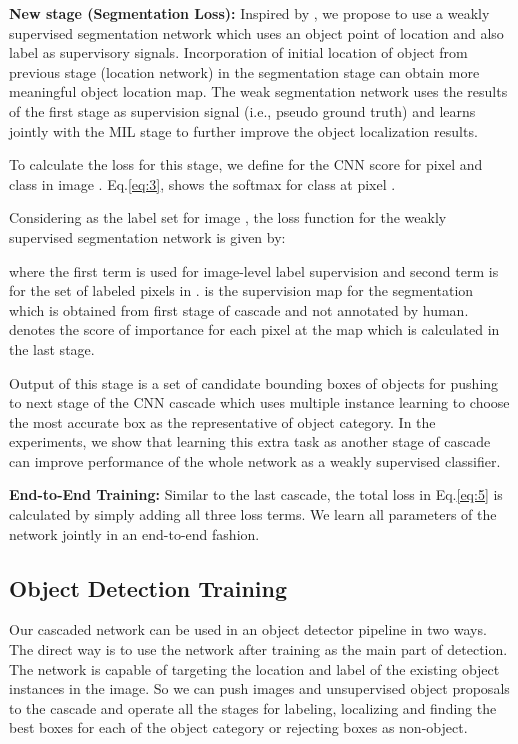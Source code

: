 \documentclass[10pt,twocolumn,letterpaper]{article}
\begin{document}
\textbf{New stage (Segmentation Loss):} Inspired by \cite{pointwise, weakSeg}, we propose to use a weakly supervised segmentation network which uses an object point of location and also label as supervisory signals. Incorporation of initial location of object from previous stage (location network) in the segmentation stage can obtain more meaningful object location map. The weak segmentation network uses the results of the first stage as supervision signal (i.e., pseudo ground truth) and learns jointly with the MIL stage to further improve the object localization results.

To calculate the loss for this stage, we define  for the CNN score for pixel  and class  in image . Eq.\ref{eq:3}, shows the softmax for class  at pixel .



Considering  as the label set for image , the loss function for the weakly supervised segmentation network is given by:

\noindent where the first term is used for image-level label supervision and second term is for the set of labeled pixels in .  is the supervision map for the segmentation which is obtained from first stage of cascade and not annotated by human.  denotes the score of importance for each pixel at the map which is calculated in the last stage.

Output of this stage is a set of candidate bounding boxes of objects for pushing to next stage of the CNN cascade which uses multiple instance learning to choose the most accurate box as the representative of object category.  In the experiments, we show that learning this extra task as another stage of cascade can improve performance of the whole network as a weakly supervised classifier.

\textbf{End-to-End Training:}
Similar to the last cascade, the total loss in Eq.\ref{eq:5} is calculated by simply adding all three loss terms. We learn all parameters of the network jointly in an end-to-end fashion.




\subsection{Object Detection Training}
Our cascaded network can be used in an object detector pipeline in two ways. The direct way is to use the network after training as the main part of detection. The network is capable of targeting the location and label of the existing object instances in the image. So we can push images and unsupervised object proposals to the cascade and operate all the stages for labeling, localizing and finding the best boxes for each of the object category or rejecting boxes as non-object. 
\end{document}
